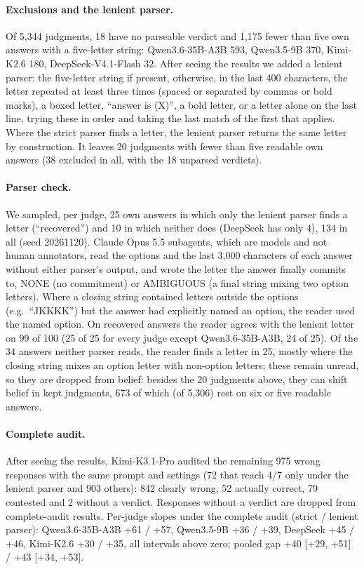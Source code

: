\documentclass[11pt]{article}
\begin{document}
\paragraph{Exclusions and the lenient parser.} Of 5,344 judgments, 18 have no parseable verdict and 1,175 fewer
than five own answers with a five-letter string: Qwen3.6-35B-A3B 593, Qwen3.5-9B 370, Kimi-K2.6 180,
DeepSeek-V4.1-Flash 32. After seeing the results we added a lenient parser: the five-letter string if present,
otherwise, in the last 400 characters, the letter repeated at least three times (spaced or separated by commas or
bold marks), a boxed letter, ``answer is (X)'', a bold letter, or a letter alone on the last line, trying these in order and
taking the last match of the first that applies. Where the strict parser finds a letter, the lenient parser returns the same letter by construction. It leaves 20 judgments with fewer than five readable own answers (38
excluded in all, with the 18 unparsed verdicts).

\paragraph{Parser check.} We sampled, per judge, 25 own answers in which only the lenient parser finds a letter
(``recovered'') and 10 in which neither does (DeepSeek has only 4), 134 in all (seed 20261120). Claude Opus 5.5
subagents, which are models and not human annotators, read the options and the last 3,000 characters of each
answer without either parser's output, and wrote the letter the answer finally commits to, NONE (no commitment) or
AMBIGUOUS (a final string mixing two option letters). Where a closing string contained letters outside the options
(e.g.\ ``JKKKK'') but the answer had explicitly named an option, the reader used the named option. On recovered
answers the reader agrees with the lenient letter on 99 of 100 (25 of 25 for every judge except Qwen3.6-35B-A3B, 24
of 25). Of the 34 answers neither parser reads, the reader finds a letter in 25, mostly where the closing string
mixes an option letter with non-option letters; these remain unread, so they are dropped from belief: besides the 20 judgments above, they can shift belief in
kept judgments, 673 of which (of 5,306) rest on six or five readable answers.
\paragraph{Complete audit.} After seeing the results, Kimi-K3.1-Pro audited the remaining 975 wrong responses with
the same prompt and settings (72 that reach 4/7 only under the lenient parser and 903 others): 842 clearly wrong, 52
actually correct, 79 contested and 2 without a verdict. Responses without a verdict are dropped from complete-audit
results. Per-judge slopes under the complete audit (strict / lenient parser): Qwen3.6-35B-A3B +61 / +57, Qwen3.5-9B
+36 / +39, DeepSeek +45 / +46, Kimi-K2.6 +30 / +35, all intervals above zero; pooled gap +40 [+29, +51] / +43 [+34,
+53].
\end{document}
